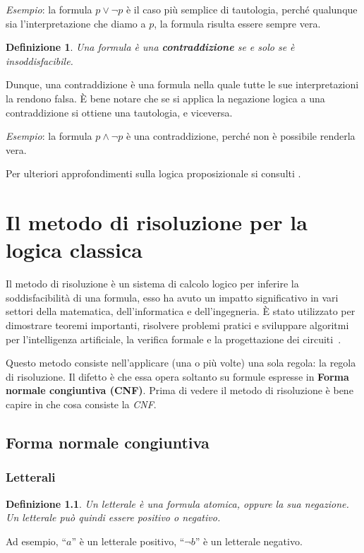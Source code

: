 \documentclass[a4paper,12pt]{report}
\newtheorem{definition}{Definizione}[section]
\begin{document}
\emph{Esempio}: la formula $p \lor \lnot p$ è il caso più semplice di tautologia, perché qualunque sia l'interpretazione che diamo a $p$, la formula risulta essere sempre vera.

\begin{definition}
    Una formula è una \textbf{contraddizione} se e solo se è insoddisfacibile.
\end{definition}
Dunque, una contraddizione è una formula nella quale tutte le sue interpretazioni la rendono falsa. \`E bene notare che se si applica la negazione logica a una contraddizione si ottiene una tautologia, e viceversa.

\emph{Esempio}: la formula $p \land \lnot p$ è una contraddizione, perché non è possibile renderla vera.

Per ulteriori approfondimenti sulla logica proposizionale si consulti \cite{logica_prop}.

% 
% 
\chapter{Il metodo di risoluzione per la logica classica}
\label{resol}
Il metodo di risoluzione è un sistema di calcolo logico per inferire la soddisfacibilità di una formula, esso ha avuto un impatto significativo in vari settori della matematica, dell'informatica e dell'ingegneria. È stato utilizzato per dimostrare teoremi importanti, risolvere problemi pratici e sviluppare algoritmi per l'intelligenza artificiale, la verifica formale e la progettazione dei circuiti~\cite{res_calculus}.

Questo metodo consiste nell'applicare (una o più volte) una sola regola: la regola di risoluzione. Il difetto è che essa opera soltanto su formule espresse in \textbf{Forma normale congiuntiva (CNF)}. Prima di vedere il metodo di risoluzione è bene capire in che cosa consiste la \emph{CNF}.

\section{Forma normale congiuntiva}
\label{CNF}
\subsection{Letterali}

\begin{definition}
    Un letterale è una formula atomica, oppure la sua negazione. Un letterale può quindi essere positivo o negativo.
\end{definition}
Ad esempio, ``$a$'' è un letterale positivo, ``$\lnot b$'' è un letterale negativo.
\end{document}
